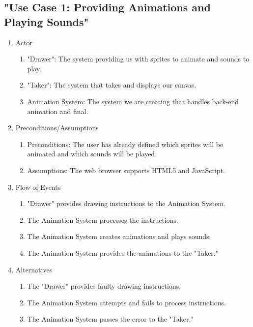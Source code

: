 \documentclass[12pt]{article}
\begin{document}
	\subsection{"Use Case 1: Providing Animations and Playing Sounds"}
\begin{enumerate}
  \item Actor
  \begin{enumerate}
  		\item "Drawer": The system providing us with sprites to animate and sounds to play.
   		 \item "Taker": The system that takes and displays our canvas.
		\item Animation System: The system we are creating that handles back-end animation and final.
  \end{enumerate}
  \item Preconditions/Assumptions
  \begin{enumerate}
   		 \item Preconditions: The user has already defined which sprites will be animated and which sounds will be played.
   		 \item Assumptions: The web browser supports HTML5 and JavaScript.
  \end{enumerate}
  \item Flow of Events
  \begin{enumerate}
   		 \item "Drawer" provides drawing instructions to the Animation System. 
   		 \item The Animation System processes the instructions.
		\item The Animation System creates animations and plays sounds.
		\item The Animation System provides the animations to the "Taker."
  \end{enumerate}
  \item Alternatives
  \begin{enumerate}
    		\item The "Drawer" provides faulty drawing instructions.
    		\item The Animation System attempts and fails to process instructions.
		\item The Animation System passes the error to the "Taker."
  \end{enumerate}
\end{enumerate}
\end{document}
